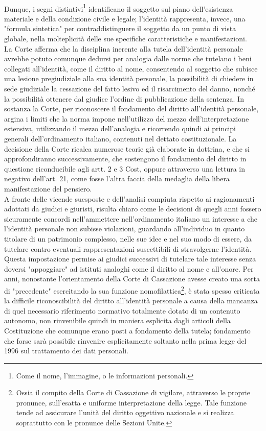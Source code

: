 \\Dunque, i segni distintivi\footnote{Come il nome, l'immagine, o le informazioni personali.} identificano il soggetto sul piano dell'esistenza materiale e della condizione civile e legale; l'identità rappresenta, invece, una "formula sintetica" per contraddistinguere il soggetto da un punto di vista globale, nella molteplicità delle sue specifiche caratteristiche e manifestazioni.
\\La Corte afferma che la disciplina inerente alla tutela dell'identità personale avrebbe potuto comunque dedursi per analogia dalle norme che tutelano i beni collegati all’identità, come il diritto al nome, consentendo al soggetto che subisce una lesione pregiudiziale alla sua identità personale, la possibilità di chiedere in sede giudiziale la cessazione del fatto lesivo ed il risarcimento del danno, nonché la possibilità ottenere dal giudice l’ordine di pubblicazione della sentenza.
In sostanza la Corte, per riconoscere il fondamento del diritto all'identità personale, argina i limiti che la norma impone nell'utilizzo del mezzo dell'interpretazione estensiva, utilizzando il mezzo dell'analogia e ricorrendo quindi ai principi generali dell'ordinamento italiano, contenuti nel dettato costituzionale.
La decisione della Corte ricalca numerose teorie già elaborate in dottrina, e che si approfondiranno successivamente, che sostengono il fondamento del diritto in questione riconducibile agli artt. 2 e 3 Cost, oppure attraverso una lettura in negativo dell'art. 21, come fosse l'altra faccia della medaglia della libera manifestazione del pensiero.
\\A fronte delle vicende suesposte e dell'analisi compiuta rispetto ai ragionamenti adottati da giudici e giuristi, risulta chiaro come le decisioni di quegli anni fossero sicuramente concordi nell’ammettere nell’ordinamento italiano un interesse a che l’identità personale non subisse violazioni, guardando all’individuo in quanto titolare di un patrimonio complesso, nelle sue idee e nel suo modo di essere, da tutelare contro eventuali rappresentazioni suscettibili di stravolgerne l'identità. 
Questa impostazione permise ai giudici successivi di tutelare tale interesse senza doversi "appoggiare" ad istituti analoghi come il diritto al nome e all'onore.
Per anni, nonostante l'orientamento della Corte di Cassazione avesse creato una sorta di "precedente" esercitando la sua funzione nomofilattica\footnote{Ossia il compito della Corte di Cassazione di vigilare, attraverso le proprie pronunce, sull'esatta e uniforme interpretazione della legge.
Tale funzione tende ad assicurare l'unità del diritto oggettivo nazionale e si realizza soprattutto con le pronunce delle Sezioni Unite.}, è stata spesso criticata la difficile riconoscibilità del diritto all'identità personale a causa della mancanza di quel necessario riferimento normativo totalmente dotato di un contenuto autonomo, non rinvenibile quindi in maniera esplicita dagli articoli della Costituzione che comunque erano posti a fondamento della tutela; fondamento che forse sarà possibile rinvenire esplicitamente soltanto nella prima legge del 1996 sul trattamento dei dati personali.
